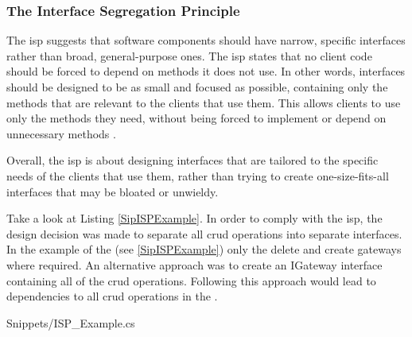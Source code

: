 \subsubsection{The Interface Segregation Principle} \label{subsubsec:isp}

The \gls{isp} suggests that software components should have narrow, specific interfaces
rather than broad, general-purpose ones. The \gls{isp} states that no client code should
be forced to depend on methods it does not use. In other words, interfaces should be
designed to be as small and focused as possible, containing only the methods that are
relevant to the clients that use them. This allows clients to use only the methods they
need, without being forced to implement or depend on unnecessary methods
\parencite[104]{robert_c_martin_clean_2018}.

Overall, the \gls{isp} is about designing interfaces that are tailored to the specific
needs of the clients that use them, rather than trying to create one-size-fits-all
interfaces that may be bloated or unwieldy.

Take a look at Listing \ref{SipISPExample}. In order to comply with the \gls{isp}, the
design decision was made to separate all \gls{crud} operations into separate interfaces.
In the example of the  (see \ref{SipISPExample})
only the delete and create gateways where required. An alternative approach was to create
an IGateway interface containing all of the \gls{crud} operations. Following this approach
would lead to dependencies to all \gls{crud} operations in the
.


    {Snippets/ISP_Example.cs}